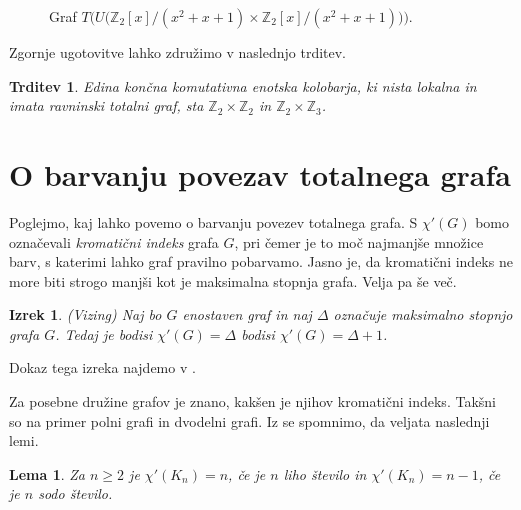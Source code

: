 \documentclass[a4paper, 12pt]{amsart}
\theoremstyle{definition} %
\theoremstyle{plain} %
\newtheorem{lema}[definicija]{Lema}
\newtheorem{izrek}[definicija]{Izrek}
\newtheorem{trditev}[definicija]{Trditev}
\newcommand{\Z}{\mathbb Z}
\begin{document}
\begin{enumerate}
\begin{figure}[h!]

\caption{Graf $T\big(U\big(\Z_2[x]/(x^2 + x + 1) \times \Z_2[x] / (x^2+x+1)\big)\big).$}
\label{T(U(R))}
\end{figure} 

\end{enumerate}

Zgornje ugotovitve lahko združimo v naslednjo trditev.

\begin{trditev}
Edina končna komutativna enotska kolobarja, ki nista lokalna in imata ravninski totalni graf, sta $\Z_2 \times \Z_2$ in $\Z_2 \times \Z_3$.
\end{trditev}

\section{O barvanju povezav totalnega grafa}
Poglejmo, kaj lahko povemo o barvanju povezev totalnega grafa. S $\chi'(G)$ bomo označevali \emph{kromatični indeks} grafa $G$, pri čemer je to moč najmanjše množice barv, s katerimi lahko graf pravilno pobarvamo. Jasno je, da kromatični indeks ne more biti strogo manjši kot je maksimalna stopnja grafa. Velja pa še več.

\begin{izrek}(Vizing)
\label{Vizing}
Naj bo $G$ enostaven graf in naj $\Delta$ označuje maksimalno stopnjo grafa $G$. Tedaj je bodisi $\chi'(G) = \Delta$ bodisi $\chi'(G) = \Delta + 1$.
\end{izrek}
Dokaz tega izreka najdemo v \cite[Izrek 5.3.2]{Diestel}.

Za posebne družine grafov je znano, kakšen je njihov kromatični indeks. Takšni so na primer polni grafi in dvodelni grafi. Iz \cite{diploma} se spomnimo, da veljata naslednji lemi.
\begin{lema}
\label{grafKn}
Za $n\ge 2$ je $\chi'(K_n) = n$, če je $n$ liho število in $\chi'(K_n) = n-1$, če je $n$ sodo število.
\end{lema}
\end{document}
